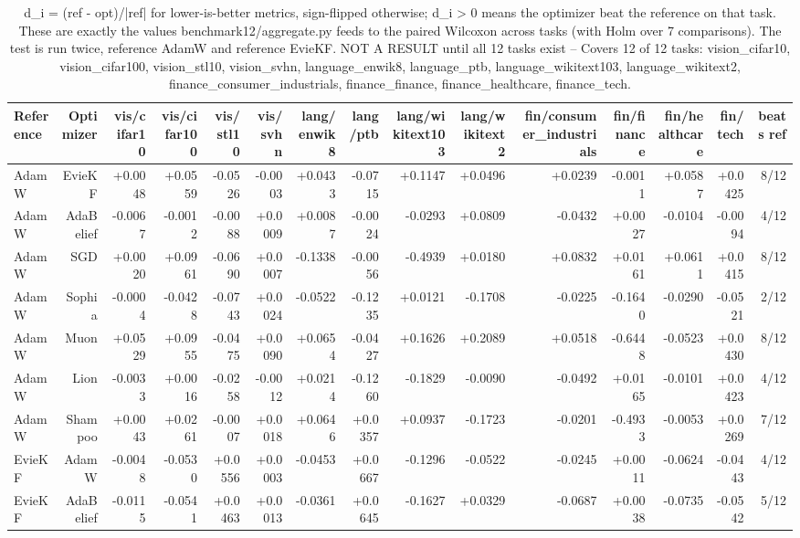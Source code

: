 \begin{table}[t]
\centering
\small
\caption{d\_i = (ref - opt)/|ref| for lower-is-better metrics, sign-flipped otherwise; d\_i > 0 means the optimizer beat the reference on that task. These are exactly the values benchmark12/aggregate.py feeds to the paired Wilcoxon across tasks (with Holm over 7 comparisons). The test is run twice, reference AdamW and reference EvieKF. NOT A RESULT until all 12 tasks exist -- Covers 12 of 12 tasks: vision\_cifar10, vision\_cifar100, vision\_stl10, vision\_svhn, language\_enwik8, language\_ptb, language\_wikitext103, language\_wikitext2, finance\_consumer\_industrials, finance\_finance, finance\_healthcare, finance\_tech.}
\label{tab:table5_relative_improvement}
\begin{tabular}{lrrrrrrrrrrrrrr}
\toprule
Reference & Optimizer & vis/cifar10 & vis/cifar100 & vis/stl10 & vis/svhn & lang/enwik8 & lang/ptb & lang/wikitext103 & lang/wikitext2 & fin/consumer\_industrials & fin/finance & fin/healthcare & fin/tech & beats ref \\
\midrule
AdamW & EvieKF & +0.0048 & +0.0559 & -0.0526 & -0.0003 & +0.0433 & -0.0715 & +0.1147 & +0.0496 & +0.0239 & -0.0011 & +0.0587 & +0.0425 & 8/12 \\
AdamW & AdaBelief & -0.0067 & -0.0012 & -0.0088 & +0.0009 & +0.0087 & -0.0024 & -0.0293 & +0.0809 & -0.0432 & +0.0027 & -0.0104 & -0.0094 & 4/12 \\
AdamW & SGD & +0.0020 & +0.0961 & -0.0690 & +0.0007 & -0.1338 & -0.0056 & -0.4939 & +0.0180 & +0.0832 & +0.0161 & +0.0611 & +0.0415 & 8/12 \\
AdamW & Sophia & -0.0004 & -0.0428 & -0.0743 & +0.0024 & -0.0522 & -0.1235 & +0.0121 & -0.1708 & -0.0225 & -0.1640 & -0.0290 & -0.0521 & 2/12 \\
AdamW & Muon & +0.0529 & +0.0955 & -0.0475 & +0.0090 & +0.0654 & -0.0427 & +0.1626 & +0.2089 & +0.0518 & -0.6448 & -0.0523 & +0.0430 & 8/12 \\
AdamW & Lion & -0.0033 & +0.0016 & -0.0258 & -0.0012 & +0.0214 & -0.1260 & -0.1829 & -0.0090 & -0.0492 & +0.0165 & -0.0101 & +0.0423 & 4/12 \\
AdamW & Shampoo & +0.0043 & +0.0261 & -0.0007 & +0.0018 & +0.0646 & +0.0357 & +0.0937 & -0.1723 & -0.0201 & -0.4933 & -0.0053 & +0.0269 & 7/12 \\
EvieKF & AdamW & -0.0048 & -0.0530 & +0.0556 & +0.0003 & -0.0453 & +0.0667 & -0.1296 & -0.0522 & -0.0245 & +0.0011 & -0.0624 & -0.0443 & 4/12 \\
EvieKF & AdaBelief & -0.0115 & -0.0541 & +0.0463 & +0.0013 & -0.0361 & +0.0645 & -0.1627 & +0.0329 & -0.0687 & +0.0038 & -0.0735 & -0.0542 & 5/12 \\

\end{tabular}
\end{table}
